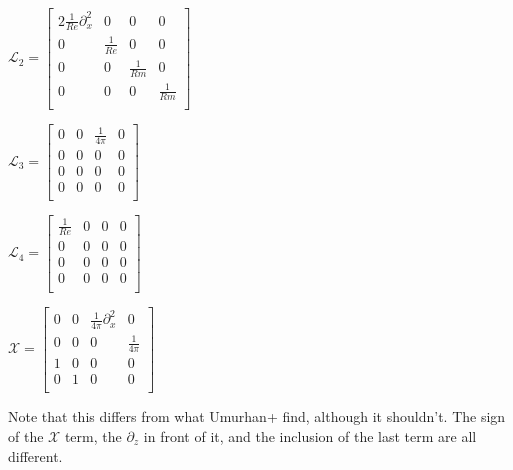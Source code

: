 \documentclass[letterpaper,12pt]{article}
\newcommand\reye{\mathrel{Re}}
\newcommand\reym{\mathrel{Rm}}
\begin{document}
\vspace{2mm}

$\mathcal{L}_2 = \left[\begin{matrix}
2\frac{1}{\reye} \partial_x^2 & 0 & 0 & 0 \\
0 & \frac{1}{\reye} & 0 & 0 \\
0 & 0 & \frac{1}{\reym} & 0 \\
0 & 0 & 0 & \frac{1}{\reym} \\ \end{matrix}\right]$

\vspace{2mm}

$\mathcal{L}_3 = \left[\begin{matrix}
0 & 0 & \frac{1}{4\pi} & 0 \\
0 & 0 & 0 & 0 \\
0 & 0 & 0 & 0 \\
0 & 0 & 0 & 0 \\ \end{matrix} \right] $

\vspace{2mm}

$\mathcal{L}_4 = \left[\begin{matrix}
\frac{1}{\reye} & 0 & 0 & 0 \\
0 & 0 & 0 & 0 \\
0 & 0 & 0 & 0 \\
0 & 0 & 0 & 0 \\ \end{matrix}\right] $ \\

\vspace{2mm}

$\mathcal{X} = \left[\begin{matrix}
0 & 0 & \frac{1}{4\pi}\partial_x^2 & 0 \\
0 & 0 & 0 & \frac{1}{4\pi} \\
1 & 0 & 0 & 0 \\
0 & 1 & 0 & 0 \\ \end{matrix} \right]$ \\

\vspace{2mm}

Note that this differs from what Umurhan+ find, although it shouldn't. The sign of the $\mathcal{X}$ term, the $\partial_z$ in front of it, and the inclusion of the last term are all different. \\
\end{document}
